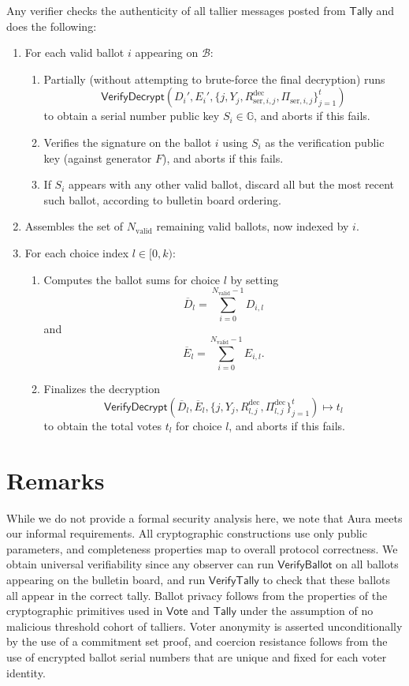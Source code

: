 \documentclass{llncs}
\newcommand{\G}{\mathbb{G}}
\newcommand{\func}[1]{\mathsf{#1}}
\begin{document}
Any verifier checks the authenticity of all tallier messages posted from $\func{Tally}$ and does the following:
\begin{enumerate}
    \item For each valid ballot $i$ appearing on $\mathcal{B}$:
    \begin{enumerate}
        \item Partially (without attempting to brute-force the final decryption) runs \[ \func{VerifyDecrypt}(D_i', E_i', \{j, Y_j, R_{\text{ser},i,j}^{\text{dec}}, \Pi_{\text{ser},i,j}\}_{j=1}^t) \] to obtain a serial number public key $S_i \in \G$, and aborts if this fails.
        \item Verifies the signature on the ballot $i$ using $S_i$ as the verification public key (against generator $F$), and aborts if this fails.
        \item If $S_i$ appears with any other valid ballot, discard all but the most recent such ballot, according to bulletin board ordering.
    \end{enumerate}
    \item Assembles the set of $N_{\text{valid}}$ remaining valid ballots, now indexed by $i$.
    \item For each choice index $l \in [0,k)$:
    \begin{enumerate}
        \item Computes the ballot sums for choice $l$ by setting \[ \overline{D}_l = \sum_{i=0}^{N_{\text{valid}}-1} D_{i,l} \] and \[ \overline{E}_l = \sum_{i=0}^{N_{\text{valid}}-1} E_{i,l}. \]
        \item Finalizes the decryption \[ \func{VerifyDecrypt}(\overline{D}_l, \overline{E}_l, \{j, Y_j, R_{l,j}^{\text{dec}}, \Pi_{l,j}^{\text{dec}}\}_{j=1}^t) \mapsto t_l \] to obtain the total votes $t_l$ for choice $l$, and aborts if this fails.
    \end{enumerate}
\end{enumerate}


\section{Remarks}

While we do not provide a formal security analysis here, we note that Aura meets our informal requirements.
All cryptographic constructions use only public parameters, and completeness properties map to overall protocol correctness.
We obtain universal verifiability since any observer can run $\func{VerifyBallot}$ on all ballots appearing on the bulletin board, and run $\func{VerifyTally}$ to check that these ballots all appear in the correct tally.
Ballot privacy follows from the properties of the cryptographic primitives used in $\func{Vote}$ and $\func{Tally}$ under the assumption of no malicious threshold cohort of talliers.
Voter anonymity is asserted unconditionally by the use of a commitment set proof, and coercion resistance follows from the use of encrypted ballot serial numbers that are unique and fixed for each voter identity.
\end{document}
